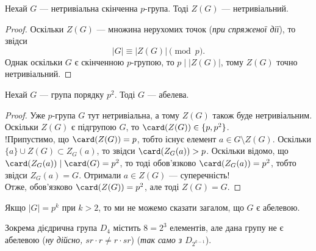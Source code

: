 \documentclass{math_library}
\begin{document}
\begin{corollary}
Нехай $G$ --- нетривіальна скінченна $p$-група. Тоді $Z(G)$ --- нетривіальний.
\end{corollary}

\begin{proof}
Оскільки $Z(G)$ --- множина нерухомих точок (\textit{при спряженої дії}), то звідси 
\[
|G| \equiv |Z(G)| \pmod p.
\]
Однак оскільки $G$ є скінченною $p$-групою, то $p \mid |Z(G)|$, тому $Z(G)$ точно нетривіальний.
\end{proof}

\begin{corollary}
Нехай $G$ --- група порядку $p^2$. Тоді $G$ --- абелева.
\end{corollary}

\begin{proof}
Уже $p$-група $G$ тут нетривіальна, а тому $Z(G)$ також буде нетривіальним. Оскільки $Z(G)$ є підгрупою $G$, то $\card(Z(G)) \in \{p,p^2\}$.\\
!Припустимо, що $\card(Z(G)) = p$, тобто існує елемент $a \in G \setminus Z(G)$. Оскільки $\{a\} \cup Z(G) \subset Z_G(a)$, то звідси $\card(Z_G(a)) > p$. Оскільки відомо, що $\card(Z_G(a)) \mid \card(G) = p^2$, то тоді обов'язково $\card(Z_G(a)) = p^2$, тобто звідси $Z_G(a) = G$. Отримали $a \in Z(G)$ --- суперечність!\\
Отже, обов'язково $\card(Z(G)) = p^2$, але тоді $Z(G) = G$.
\end{proof}

\begin{remark}
Якщо $|G| = p^k$ при $k > 2$, то ми не можемо сказати загалом, що $G$ є абелевою.
\end{remark}

\begin{example}
Зокрема дієдрична група $D_4$ містить $8 = 2^3$ елементів, але дана групу не є абелевою (\textit{ну дійсно, $sr \cdot r \neq r \cdot sr$}) (\textit{так само з $D_{2^{k-1}}$}).
\end{example}
\end{document}
